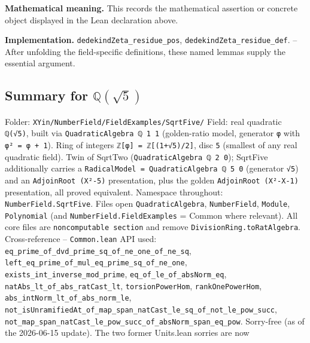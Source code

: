 \documentclass[UTF8,a4paper,11pt,fontset=fandol]{ctexart}
\theoremstyle{definition}
\begin{document}
\noindent\textbf{Mathematical meaning.} This records the mathematical assertion or concrete object displayed in the Lean declaration above.\par
\noindent\textbf{Implementation.} \texttt{dedekindZeta\_\allowbreak{}residue\_\allowbreak{}pos}, \texttt{dedekindZeta\_\allowbreak{}residue\_\allowbreak{}def}. -- After unfolding the field-specific definitions, these named lemmas supply the essential argument.\par


\subsection{Summary for \(\mathbb Q(\sqrt5)\)}

Folder: \texttt{XYin/\allowbreak{}NumberField/\allowbreak{}FieldExamples/\allowbreak{}SqrtFive/\allowbreak{}} Field: real quadratic \texttt{ℚ(√5)}, built via \texttt{QuadraticAlgebra ℚ 1 1} (golden-ratio model, generator \texttt{φ} with \texttt{φ² = φ + 1}). Ring of integers \texttt{ℤ[φ] = ℤ[(1+√5)/\allowbreak{}2]}, disc \texttt{5} (smallest of any real quadratic field). Twin of SqrtTwo (\texttt{QuadraticAlgebra ℚ 2 0}); SqrtFive additionally carries a \texttt{RadicalModel = QuadraticAlgebra ℚ 5 0} (generator \texttt{√5}) and an \texttt{AdjoinRoot (X²-5)} presentation, plus the golden \texttt{AdjoinRoot (X²-X-1)} presentation, all proved equivalent. Namespace throughout: \texttt{NumberField.\allowbreak{}SqrtFive}. Files open \texttt{QuadraticAlgebra}, \texttt{NumberField}, \texttt{Module}, \texttt{Polynomial} (and \texttt{NumberField.\allowbreak{}FieldExamples} = Common where relevant). All core files are \texttt{noncomputable section} and remove \texttt{DivisionRing.\allowbreak{}toRatAlgebra}. Cross-reference -- \texttt{Common.\allowbreak{}lean} API used: \texttt{eq\_\allowbreak{}prime\_\allowbreak{}of\_\allowbreak{}dvd\_\allowbreak{}prime\_\allowbreak{}sq\_\allowbreak{}of\_\allowbreak{}ne\_\allowbreak{}one\_\allowbreak{}of\_\allowbreak{}ne\_\allowbreak{}sq}, \texttt{left\_\allowbreak{}eq\_\allowbreak{}prime\_\allowbreak{}of\_\allowbreak{}mul\_\allowbreak{}eq\_\allowbreak{}prime\_\allowbreak{}sq\_\allowbreak{}of\_\allowbreak{}ne\_\allowbreak{}one}, \texttt{exists\_\allowbreak{}int\_\allowbreak{}inverse\_\allowbreak{}mod\_\allowbreak{}prime}, \texttt{eq\_\allowbreak{}of\_\allowbreak{}le\_\allowbreak{}of\_\allowbreak{}absNorm\_\allowbreak{}eq}, \texttt{natAbs\_\allowbreak{}lt\_\allowbreak{}of\_\allowbreak{}abs\_\allowbreak{}ratCast\_\allowbreak{}lt}, \texttt{torsionPowerHom}, \texttt{rankOnePowerHom}, \texttt{abs\_\allowbreak{}intNorm\_\allowbreak{}lt\_\allowbreak{}of\_\allowbreak{}abs\_\allowbreak{}norm\_\allowbreak{}le}, \texttt{not\_\allowbreak{}isUnramifiedAt\_\allowbreak{}of\_\allowbreak{}map\_\allowbreak{}span\_\allowbreak{}natCast\_\allowbreak{}le\_\allowbreak{}sq\_\allowbreak{}of\_\allowbreak{}not\_\allowbreak{}le\_\allowbreak{}pow\_\allowbreak{}succ}, \texttt{not\_\allowbreak{}map\_\allowbreak{}span\_\allowbreak{}natCast\_\allowbreak{}le\_\allowbreak{}pow\_\allowbreak{}succ\_\allowbreak{}of\_\allowbreak{}absNorm\_\allowbreak{}span\_\allowbreak{}eq\_\allowbreak{}pow}. Sorry-free (as of the 2026-06-15 update). The two former Units.lean sorries are now 
\end{document}
